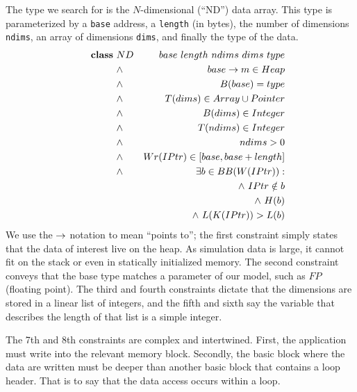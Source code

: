 

The type we search for is the $N$-dimensional (``ND'') data array.
This type is parameterized by a \texttt{base} address, a
\texttt{length} (in bytes), the number of
dimensions \texttt{ndims}, an array of dimensions \texttt{dims}, and
finally the type of the data.
\begin{eqnarray}
  \indent \textbf{class} \ & ND & \  base \  length \  ndims \  dims \  type
    \nonumber\\
  \indent &\land& base \pointsto m \in Heap\\
  \indent &\land& B(base) = type\\
  \indent &\land& T(dims) \in Array \union Pointer\\
  \indent &\land& B(dims) \in Integer\\
  \indent &\land& T(ndims) \in Integer\\
  \indent &\land& ndims > 0\\
  \indent &\land& Wr(IPtr) \in [ base, base + length ]\\
  \indent &\land& \exists b \in BB(W(IPtr)) : \nonumber\\
    && \land \ IPtr \notin b \nonumber \\
    && \land \ H(b) \nonumber\\
    && \land \ L(K(IPtr)) > L(b)
\end{eqnarray}
We use the $\rightarrow$ notation to mean ``points to''; the first
constraint simply states that the data of interest live on the heap.
As simulation data is large, it cannot fit on the stack or even in
statically initialized memory.  The second constraint conveys that the base
type matches a parameter of our model, such as $FP$ (floating point).
The third and fourth constraints dictate that the dimensions are stored
in a linear list of integers, and the fifth and sixth say the variable
that describes the length of that list is a simple integer.

The 7th and 8th constraints are complex and intertwined.  First, the
application must write into the relevant memory block.  Secondly,
the basic block where the data are written must be deeper than another
basic block that contains a loop header.  That is to say that the data
access occurs within a loop.

